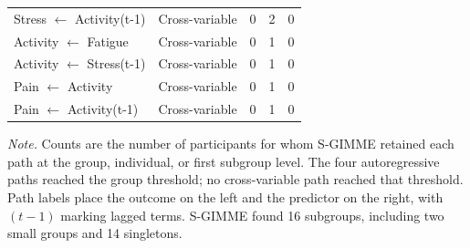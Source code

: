 \begin{table}[H]
\begin{tabular*}{\textwidth}{@{\extracolsep{\fill}}llccc@{}}
Stress $\leftarrow$ Activity(t-1) & Cross-variable & 0 & 2 & 0 \\
Activity $\leftarrow$ Fatigue & Cross-variable & 0 & 1 & 0 \\
Activity $\leftarrow$ Stress(t-1) & Cross-variable & 0 & 1 & 0 \\
Pain $\leftarrow$ Activity & Cross-variable & 0 & 1 & 0 \\
Pain $\leftarrow$ Activity(t-1) & Cross-variable & 0 & 1 & 0 \\
\bottomrule
\end{tabular*}
\par\vspace{3pt}\noindent\parbox{\textwidth}{\scriptsize\textit{Note.} Counts are the number of participants for whom S-GIMME retained each path at the group, individual, or first subgroup level. The four autoregressive paths reached the group threshold; no cross-variable path reached that threshold. Path labels place the outcome on the left and the predictor on the right, with $(t-1)$ marking lagged terms. S-GIMME found 16 subgroups, including two small groups and 14 singletons.}
\endgroup
\end{table}
